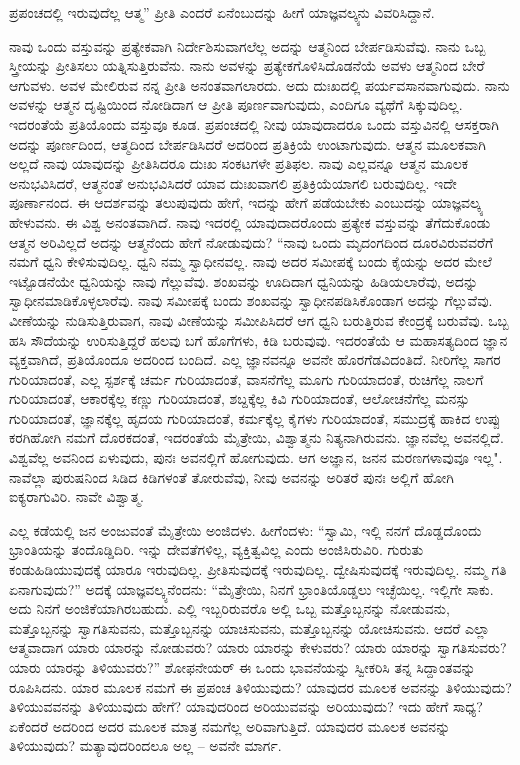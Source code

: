 ಪ್ರಪಂಚದಲ್ಲಿ ಇರುವುದೆಲ್ಲ ಆತ್ಮ” ಪ್ರೀತಿ ಎಂದರೆ ಏನೆಂಬುದನ್ನು ಹೀಗೆ ಯಾಜ್ಞವಲ್ಕ್ಯನು ವಿವರಿಸಿದ್ದಾನೆ.

ನಾವು ಒಂದು ವಸ್ತುವನ್ನು ಪ್ರತ್ಯೇಕವಾಗಿ ನಿರ್ದೇಶಿಸುವಾಗಲೆಲ್ಲ ಅದನ್ನು ಆತ್ಮನಿಂದ ಬೇರ್ಪಡಿಸುವೆವು. ನಾನು ಒಬ್ಬ ಸ್ತ್ರೀಯನ್ನು ಪ್ರೀತಿಸಲು ಯತ್ನಿಸುತ್ತಿರುವೆನು. ನಾನು ಅವಳನ್ನು ಪ್ರತ್ಯೇಕಗೊಳಿಸಿದೊಡನೆಯೆ ಅವಳು ಆತ್ಮನಿಂದ ಬೇರೆ ಆಗುವಳು. ಅವಳ ಮೇಲಿರುವ ನನ್ನ ಪ್ರೀತಿ ಅನಂತವಾಗಲಾರದು. ಅದು ದುಃಖದಲ್ಲಿ ಪರ್ಯವಸಾನವಾಗುವುದು. ನಾನು ಅವಳನ್ನು ಆತ್ಮನ ದೃಷ್ಟಿಯಿಂದ ನೋಡಿದಾಗ ಆ ಪ್ರೀತಿ ಪೂರ್ಣವಾಗುವುದು, ಎಂದಿಗೂ ವ್ಯಥೆಗೆ ಸಿಕ್ಕುವುದಿಲ್ಲ. ಇದರಂತೆಯೆ ಪ್ರತಿಯೊಂದು ವಸ್ತುವೂ ಕೂಡ. ಪ್ರಪಂಚದಲ್ಲಿ ನೀವು ಯಾವುದಾದರೂ ಒಂದು ವಸ್ತುವಿನಲ್ಲಿ ಆಸಕ್ತರಾಗಿ ಅದನ್ನು ಪೂರ್ಣದಿಂದ, ಆತ್ಮದಿಂದ ಬೇರ್ಪಡಿಸಿದರೆ ಅದರಿಂದ ಪ್ರತಿಕ್ರಿಯೆ ಉಂಟಾಗುವುದು. ಆತ್ಮನ ಮೂಲಕವಾಗಿ ಅಲ್ಲದೆ ನಾವು ಯಾವುದನ್ನು ಪ್ರೀತಿಸಿದರೂ ದುಃಖ ಸಂಕಟಗಳೇ ಪ್ರತಿಫಲ. ನಾವು ಎಲ್ಲವನ್ನೂ ಆತ್ಮನ ಮೂಲಕ ಅನುಭವಿಸಿದರೆ, ಆತ್ಮನಂತೆ ಅನುಭವಿಸಿದರೆ ಯಾವ ದುಃಖವಾಗಲಿ ಪ್ರತಿಕ್ರಿಯೆಯಾಗಲಿ ಬರುವುದಿಲ್ಲ. ಇದೇ ಪೂರ್ಣಾನಂದ. ಈ ಆದರ್ಶವನ್ನು ತಲುಪುವುದು ಹೇಗೆ, ಇದನ್ನು ಹೇಗೆ ಪಡೆಯಬೇಕು ಎಂಬುದನ್ನು ಯಾಜ್ಞವಲ್ಕ್ಯ ಹೇಳುವನು. ಈ ವಿಶ್ವ ಅನಂತವಾಗಿದೆ. ನಾವು ಇದರಲ್ಲಿ ಯಾವುದಾದರೊಂದು ಪ್ರತ್ಯೇಕ ವಸ್ತುವನ್ನು ತೆಗೆದುಕೊಂಡು ಆತ್ಮನ ಅರಿವಿಲ್ಲದೆ ಅದನ್ನು ಆತ್ಮನೆಂದು ಹೇಗೆ ನೋಡುವುದು? “ನಾವು ಒಂದು ಮೃದಂಗದಿಂದ ದೂರವಿರುವವರೆಗೆ ನಮಗೆ ಧ್ವನಿ ಕೇಳಿಸುವುದಿಲ್ಲ. ಧ್ವನಿ ನಮ್ಮ ಸ್ವಾಧೀನವಲ್ಲ. ನಾವು ಅದರ ಸಮೀಪಕ್ಕೆ ಬಂದು ಕೈಯನ್ನು ಅದರ ಮೇಲೆ ಇಟ್ಟೊಡನೆಯೇ ಧ್ವನಿಯನ್ನು ನಾವು ಗೆಲ್ಲುವೆವು. ಶಂಖವನ್ನು ಊದಿದಾಗ ಧ್ವನಿಯನ್ನು ಹಿಡಿಯಲಾರೆವು, ಅದನ್ನು ಸ್ವಾಧೀನಮಾಡಿಕೊಳ್ಳಲಾರೆವು. ನಾವು ಸಮೀಪಕ್ಕೆ ಬಂದು ಶಂಖವನ್ನು ಸ್ವಾಧೀನಪಡಿಸಿಕೊಂಡಾಗ ಅದನ್ನು ಗೆಲ್ಲುವೆವು. ವೀಣೆಯನ್ನು ನುಡಿಸುತ್ತಿರುವಾಗ, ನಾವು ವೀಣೆಯನ್ನು ಸಮೀಪಿಸಿದರೆ ಆಗ ಧ್ವನಿ ಬರುತ್ತಿರುವ ಕೇಂದ್ರಕ್ಕೆ ಬರುವೆವು. ಒಬ್ಬ ಹಸಿ ಸೌದೆಯನ್ನು ಉರಿಸುತ್ತಿದ್ದರೆ ಹಲವು ಬಗೆ ಹೊಗೆಗಳು, ಕಿಡಿ ಬರುವುವು. ಇದರಂತೆಯೆ ಆ ಮಹಾಸತ್ಯದಿಂದ ಜ್ಞಾನ ವ್ಯಕ್ತವಾಗಿದೆ, ಪ್ರತಿಯೊಂದೂ ಅದರಿಂದ ಬಂದಿದೆ. ಎಲ್ಲ ಜ್ಞಾನವನ್ನೂ ಅವನೇ ಹೊರಗೆಡವಿದಂತಿದೆ. ನೀರಿಗೆಲ್ಲ ಸಾಗರ ಗುರಿಯಾದಂತೆ, ಎಲ್ಲ ಸ್ಪರ್ಶಕ್ಕೆ ಚರ್ಮ ಗುರಿಯಾದಂತೆ, ವಾಸನೆಗೆಲ್ಲ ಮೂಗು ಗುರಿಯಾದಂತೆ, ರುಚಿಗೆಲ್ಲ ನಾಲಗೆ ಗುರಿಯಾದಂತೆ, ಆಕಾರಕ್ಕೆಲ್ಲ ಕಣ್ಣು ಗುರಿಯಾದಂತೆ, ಶಬ್ದಕ್ಕೆಲ್ಲ ಕಿವಿ ಗುರಿಯಾದಂತೆ, ಆಲೋಚನೆಗೆಲ್ಲ ಮನಸ್ಸು ಗುರಿಯಾದಂತೆ, ಜ್ಞಾನಕ್ಕೆಲ್ಲ ಹೃದಯ ಗುರಿಯಾದಂತೆ, ಕರ್ಮಕ್ಕೆಲ್ಲ ಕೈಗಳು ಗುರಿಯಾದಂತೆ, ಸಮುದ್ರಕ್ಕೆ ಹಾಕಿದ ಉಪ್ಪು ಕರಗಿಹೋಗಿ ನಮಗೆ ದೊರಕದಂತೆ, ಇದರಂತೆಯೆ ಮೈತ್ರೇಯಿ, ವಿಶ್ವಾತ್ಮನು ನಿತ್ಯನಾಗಿರುವನು. ಜ್ಞಾನವೆಲ್ಲ ಅವನಲ್ಲಿದೆ. ವಿಶ್ವವೆಲ್ಲ ಅವನಿಂದ ಏಳುವುದು, ಪುನಃ ಅವನಲ್ಲಿಗೆ ಹೋಗುವುದು. ಆಗ ಅಜ್ಞಾನ, ಜನನ ಮರಣಗಳಾವುವೂ ಇಲ್ಲ". ನಾವೆಲ್ಲಾ ಪುರುಷನಿಂದ ಸಿಡಿದ ಕಿಡಿಗಳಂತೆ ತೋರುವೆವು, ನೀವು ಅವನನ್ನು ಅರಿತರೆ ಪುನಃ ಅಲ್ಲಿಗೆ ಹೋಗಿ ಐಕ್ಯರಾಗುವಿರಿ. ನಾವೇ ವಿಶ್ವಾತ್ಮ.

ಎಲ್ಲ ಕಡೆಯಲ್ಲಿ ಜನ ಅಂಜುವಂತೆ ಮೈತ್ರೇಯಿ ಅಂಜಿದಳು. ಹೀಗೆಂದಳು: “ಸ್ವಾಮಿ, ಇಲ್ಲಿ ನನಗೆ ದೊಡ್ಡದೊಂದು ಭ್ರಾಂತಿಯನ್ನು ತಂದೊಡ್ಡಿದಿರಿ. ಇನ್ನು ದೇವತೆಗಳಿಲ್ಲ, ವ್ಯಕ್ತಿತ್ವವಿಲ್ಲ ಎಂದು ಅಂಜಿಸಿರುವಿರಿ. ಗುರುತು ಕಂಡುಹಿಡಿಯುವುದಕ್ಕೆ ಯಾರೂ ಇರುವುದಿಲ್ಲ. ಪ್ರೀತಿಸುವುದಕ್ಕೆ ಇರುವುದಿಲ್ಲ. ದ್ವೇಷಿಸುವುದಕ್ಕೆ ಇರುವುದಿಲ್ಲ. ನಮ್ಮ ಗತಿ ಏನಾಗುವುದು?'' ಅದಕ್ಕೆ ಯಾಜ್ಞವಲ್ಕ್ಯನೆಂದನು: “ಮೈತ್ರೇಯಿ, ನಿನಗೆ ಭ್ರಾಂತಿಯೊಡ್ಡಲು ಇಚ್ಛೆಯಿಲ್ಲ. ಇಲ್ಲಿಗೇ ಸಾಕು. ಅದು ನಿನಗೆ ಅಂಜಿಕೆಯಾಗಿರಬಹುದು. ಎಲ್ಲಿ ಇಬ್ಬರಿರುವರೊ ಅಲ್ಲಿ ಒಬ್ಬ ಮತ್ತೊಬ್ಬನನ್ನು ನೋಡುವನು, ಮತ್ತೊಬ್ಬನನ್ನು ಸ್ವಾಗತಿಸುವನು, ಮತ್ತೊಬ್ಬನನ್ನು ಯಾಚಿಸುವನು, ಮತ್ತೊಬ್ಬನನ್ನು ಯೋಚಿಸುವನು. ಆದರೆ ಎಲ್ಲಾ ಆತ್ಮವಾದಾಗ ಯಾರು ಯಾರನ್ನು ನೋಡುವರು? ಯಾರು ಯಾರನ್ನು ಕೇಳುವರು? ಯಾರು ಯಾರನ್ನು ಸ್ವಾಗತಿಸುವರು? ಯಾರು ಯಾರನ್ನು ತಿಳಿಯುವರು?” ಶೋಫನೇಯರ್ ಈ ಒಂದು ಭಾವನೆಯನ್ನು ಸ್ವೀಕರಿಸಿ ತನ್ನ ಸಿದ್ದಾಂತವನ್ನು ರೂಪಿಸಿದನು. ಯಾರ ಮೂಲಕ ನಮಗೆ ಈ ಪ್ರಪಂಚ ತಿಳಿಯುವುದು? ಯಾವುದರ ಮೂಲಕ ಅವನನ್ನು ತಿಳಿಯುವುದು? ತಿಳಿಯುವವನನ್ನು ತಿಳಿಯುವುದು ಹೇಗೆ? ಯಾವುದರಿಂದ ಅರಿಯುವವನ್ನು ಅರಿಯುವುದು? ಇದು ಹೇಗೆ ಸಾಧ್ಯ? ಏಕೆಂದರೆ ಅದರಿಂದ ಅದರ ಮೂಲಕ ಮಾತ್ರ ನಮಗೆಲ್ಲ ಅರಿವಾಗುತ್ತಿದೆ. ಯಾವುದರ ಮೂಲಕ ಅವನನ್ನು ತಿಳಿಯುವುದು? ಮತ್ಯಾವುದರಿಂದಲೂ ಅಲ್ಲ – ಅವನೇ ಮಾರ್ಗ.


